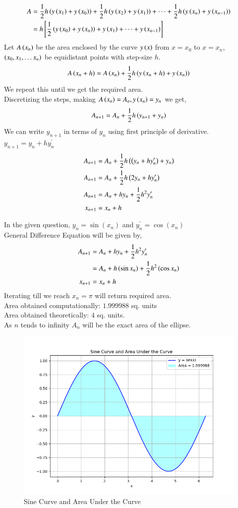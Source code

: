 \documentclass[journal]{IEEEtran}
\begin{document}
\begin{align}
    A&=\frac{1}{2}h\left(y\left(x_1\right)+y\left(x_0\right)\right)+ \frac{1}{2}h\left(y\left(x_2\right)+y\left(x_1\right)\right)+\dots+\frac{1}{2}h\left(y\left(x_n\right)+y\left(x_{n-1}\right)\right)\\
  &=h{}\left[\frac{1}{2}\left(y\left(x_0\right)+y\left(x_n\right)\right)+ y\left(x_1\right)+\dots+y\left(x_{n-1}\right)\right]
\end{align}
Let $A\left(x_n\right)$ be the area enclosed by the curve $y\left(x\right)$ from $x=x_0$ to $x=x_n$, $\left(x_0, x_1, \dots x_n\right)$ be equidistant points with step-size $h$.
\begin{align}
  A\left(x_n+h\right)=A\left(x_n\right)+\frac{1}{2}h\left(y\left(x_n+h\right)+y\left(x_n\right)\right)
\end{align}
We repeat this until we get the required area.\\
Discretizing the steps, making $A\left(x_n\right)=A_n, y\left(x_n\right)=y_n$ we get,
\begin{align}
 A_{n+1}=A_n+\frac{1}{2}h\left(y_{n+1}+y_n\right)
\end{align}
We can write $y_{n+1}$ in terms of $y_n$ using first principle of derivative. $y_{n+1}=y_n+hy^{\prime}_n$
\begin{align}
  A_{n+1}&=A_n+\frac{1}{2}h\left(\left(y_{n}+hy^{\prime}_n\right)+y_n\right)\\
  A_{n+1}&=A_n+\frac{1}{2}h\left(2y_n+hy^{\prime}_n\right)\\
  A_{n+1}&=A_n+hy_n+\frac{1}{2}h^2y^{\prime}_n\\
  x_{n+1}&=x_n+h
\end{align}

In the given question, $y_n=\sin{(x_n)}$ and $y^{\prime}_n=\cos{(x_n)}$\\
General Difference Equation will be given by,
\begin{align}
  A_{n+1}&=A_n+hy_n+\frac{1}{2}h^2y^{\prime}_n\\
  &=A_n+h\left(\sin{x_n}\right)+\frac{1}{2}h^2\left(\cos{x_n}\right)\\
  x_{n+1}&=x_n+h
\end{align}
Iterating till we reach $x_n=\pi$ will return required area.\\
Area obtained computationally: $1.999988$ sq. units\\
Area obtained theoretically: $4$ sq. units.\\
As $n$ tends to infinity $A_n$ will be the exact area of the ellipse.

\begin{figure}[h!]
    \centering
    \includegraphics[width=\columnwidth]{figs/i.png}
    \caption{Sine Curve and Area Under the Curve}
    \label{fig:sine_curve}
\end{figure}
\end{document}
